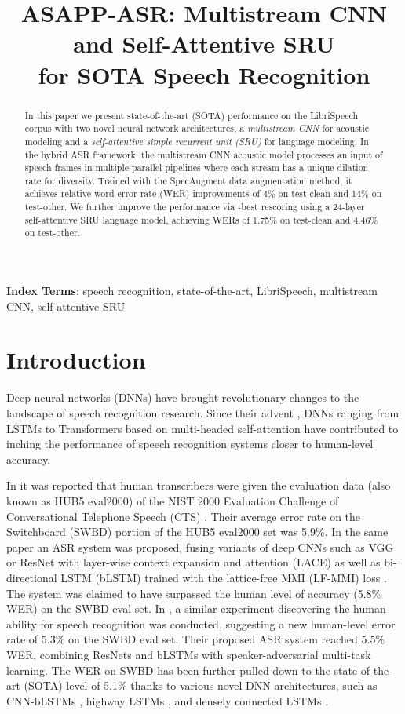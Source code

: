 \documentclass[a4paper]{article}
\title{ASAPP-ASR: Multistream CNN and Self-Attentive SRU\\for SOTA Speech Recognition}
\begin{document}
\maketitle
\begin{abstract}
In this paper we present state-of-the-art (SOTA) performance on the LibriSpeech corpus with two novel neural network architectures, a \textit{multistream CNN} for acoustic modeling and a \textit{self-attentive simple recurrent unit (SRU)} for language modeling. In the hybrid ASR framework, the multistream CNN acoustic model processes an input of speech frames in multiple parallel pipelines where each stream has a unique dilation rate for diversity. Trained with the SpecAugment data augmentation method, it achieves relative word error rate (WER) improvements of 4\% on test-clean and 14\% on test-other. We further improve the performance via -best rescoring using a 24-layer self-attentive SRU language model, achieving WERs of 1.75\% on test-clean and 4.46\% on test-other.   
\end{abstract}
\noindent\textbf{Index Terms}: speech recognition, state-of-the-art, LibriSpeech, multistream CNN, self-attentive SRU

\section{Introduction}
Deep neural networks (DNNs) have brought revolutionary changes to the landscape of speech recognition research. Since their advent \cite{Hinton12}, DNNs ranging from LSTMs \cite{Hochreiter97} to Transformers based on multi-headed self-attention \cite{vaswani} have contributed to inching the performance of speech recognition systems closer to human-level accuracy. 

In \cite{Xiong16-2} it was reported that human transcribers were given the evaluation data (also known as HUB5 eval2000) of the NIST 2000 Evaluation Challenge of Conversational Telephone Speech (CTS) \cite{William00}. Their average error rate on the Switchboard (SWBD) portion of the HUB5 eval2000 set was 5.9\%. In the same paper an ASR system was proposed, fusing variants of deep CNNs such as VGG \cite{simoyan14} or ResNet \cite{He16} with layer-wise context expansion and attention (LACE) \cite{yu16} as well as bi-directional LSTM (bLSTM) trained with the lattice-free MMI (LF-MMI) loss \cite{Povey16}. The system was claimed to have surpassed the human level of accuracy (5.8\% WER) on the SWBD eval set. In \cite{Saon17}, a similar experiment discovering the human ability for speech recognition was conducted, suggesting a new human-level error rate of 5.3\% on the SWBD eval set. Their proposed ASR system reached 5.5\% WER, combining ResNets and bLSTMs with speaker-adversarial multi-task learning. The WER on SWBD has been further pulled down to the state-of-the-art (SOTA) level of 5.1\% thanks to various novel DNN architectures, such as CNN-bLSTMs \cite{Han17,Xiong17}, highway LSTMs \cite{Kurata17}, and densely connected LSTMs \cite{han18,capio}. 
\end{document}
